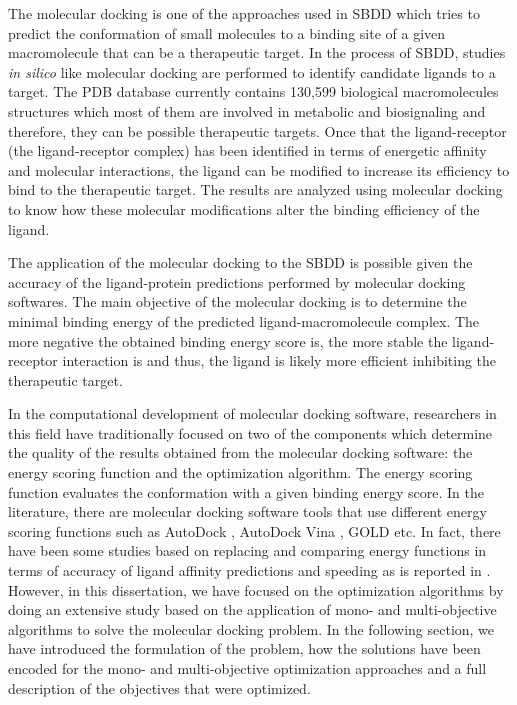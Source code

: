 The molecular docking is one of the approaches used in SBDD which tries to predict the conformation of small molecules to a binding site of a given macromolecule that can be a therapeutic target. In the process of SBDD, studies \emph{in silico} like molecular docking are performed to identify candidate ligands to a target. The PDB database currently contains 130,599 biological macromolecules structures which most of them are involved in metabolic and biosignaling and therefore, they can be possible therapeutic targets. Once that the ligand-receptor (the ligand-receptor complex) has been identified in terms of energetic affinity and molecular interactions, the ligand can be modified to increase its efficiency to bind to the therapeutic target. The results are analyzed using molecular docking to know how these molecular modifications alter the binding efficiency of the ligand.

The application of the molecular docking to the SBDD is possible given the accuracy of the ligand-protein predictions performed by molecular docking softwares. The main objective of the molecular docking is to determine the minimal binding energy of the predicted ligand-macromolecule complex. The more negative the obtained binding energy score is, the more stable the ligand-receptor interaction is and thus, the ligand is likely more efficient inhibiting the therapeutic target.

In the computational development of molecular docking software, researchers in this field have traditionally focused on two of the components which determine the quality of the results obtained from the molecular docking software: the energy scoring function and the optimization algorithm. The energy scoring function evaluates the conformation with a given binding energy score. In the literature, there are molecular docking software tools that use different energy scoring functions such as AutoDock \cite{Morris2009}, AutoDock Vina \cite{Trott2010}, GOLD \cite{Verdonk2003} etc. In fact, there have been some studies based on replacing and comparing energy functions in terms of accuracy of ligand affinity predictions and speeding as is reported in \cite{Chang2010}. However, in this dissertation, we have focused on the optimization algorithms by doing an extensive study based on the application of mono- and multi-objective algorithms to solve the molecular docking problem. In the following section, we have introduced the formulation of the problem, how the solutions have been encoded for the mono- and multi-objective optimization approaches and a full description of the objectives that were optimized.

